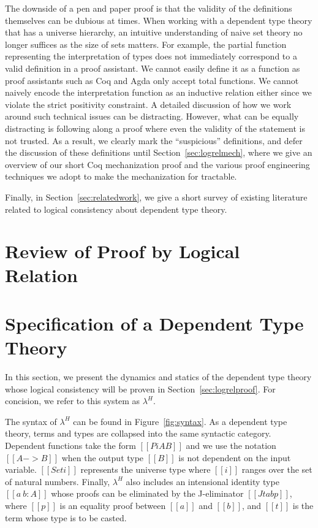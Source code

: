 \documentclass[nonacm]{acmart}
\newcommand{\lang}{$\lambda^H$\xspace}
\begin{document}
The downside of a pen and paper proof is that the validity of the
definitions themselves can be dubious at times. When working with a
dependent type theory that has a universe hierarchy, an intuitive
understanding of naive set theory no longer suffices as the size of
sets matters. For example, the partial function representing the
interpretation of types does not immediately correspond to a valid
definition in a proof assistant. We cannot easily define it as a
function as proof assistants such as Coq and Agda only accept total
functions. We cannot naively encode the interpretation function as an
inductive relation either since we violate the strict positivity
constraint. A detailed discussion of how we work around such technical
issues can be distracting. However, what can be equally distracting is
following along a proof where even the validity of the statement is
not trusted. As a result, we clearly mark the ``suspicious''
definitions, and defer the discussion of these definitions
until Section~\ref{sec:logrelmech}, where we give an overview of our
short Coq mechanization proof and the various proof engineering
techniques we adopt to make the mechanization for tractable.

Finally, in Section~\ref{sec:relatedwork}, we give a short survey of
existing literature related to logical consistency about dependent
type theory.

\section{Review of Proof by Logical Relation}
\label{sec:logrelstlc}


\section{Specification of a Dependent Type Theory}
\label{sec:spec}
In this section, we present the dynamics and statics of the
dependent type theory whose logical consistency will be proven in
Section~\ref{sec:logrelproof}. For concision, we refer to this system
as \lang.

The syntax of \lang can be found in Figure~\ref{fig:syntax}. As a
dependent type theory, terms and types are collapsed into the same
syntactic category. Dependent functions take the form $[[Pi A B]]$ and
we use the notation $[[A -> B]]$ when the output type $[[B]]$ is not
dependent on the input variable. $[[Set i]]$ represents the universe
type where $[[i]]$ ranges over the set of natural numbers. Finally,
\lang also includes an intensional identity type $[[a ~ b : A]]$ whose
proofs can be eliminated by the J-eliminator $[[J t a b p]]$, where
$[[p]]$ is an equality proof between $[[a]]$ and $[[b]]$, and $[[t]]$
is the term whose type is to be casted.
\end{document}
